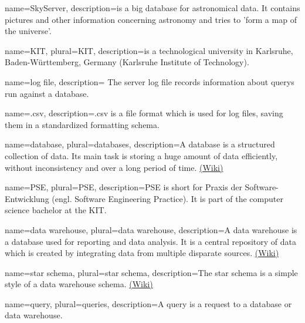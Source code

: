{
  name=SkyServer,
  description={is a big database for astronomical data. It contains pictures
              and other information concerning astronomy and tries to 'form a 
              map of the universe'.
              }
}


{
  name=KIT,
  plural=KIT,
  description={is a technological university in Karlsruhe, Baden-Württemberg, Germany 
              (Karlsruhe Institute of Technology).}
}


{
  name=log file,
  description={
The server log file records information about \glspl{query} run against a  \gls{database}.}
}


{
  name=.csv,
  description={.csv is a file format which is used for log files, 
  saving them in a standardized formatting schema.}
}


{
  name=database,
  plural=databases,
  description={A database is a structured collection of data. Its main task is
  storing a huge amount of data efficiently, without inconsistency and over a long period of time.   
  \href{https://en.wikipedia.org/wiki/Database}{(Wiki)}}
}


{
  name=PSE,
  plural=PSE,
  description={PSE is short for Praxis der Software-Entwicklung (engl. Software Engineering Practice).
  It is part of the computer science bachelor at the \gls{KIT}.}
}


{
  name=data warehouse,
  plural=data warehouse,
  description={A data warehouse is a \gls{database} used for reporting and data analysis.
  It is a central repository of data which is created by integrating data from multiple disparate sources.
  \href{https://en.wikipedia.org/wiki/Data_warehouse}{(Wiki)}}
}
  
  
{
  name=star schema,
  plural=star schema,
  description={The star schema is a simple style of a \gls{data warehouse} schema.
 \href{https://en.wikipedia.org/wiki/Star_schema}{(Wiki)}}
}

  
{
  name=query,
  plural=queries,
  description={A query is a request to a \gls{database} or \gls{data warehouse}.}
}


